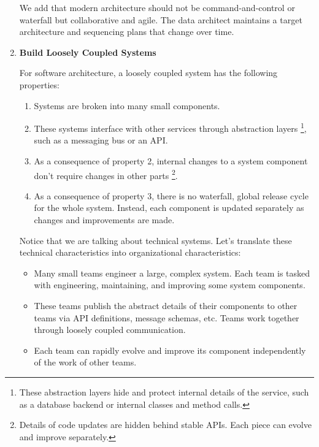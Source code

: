 \begin{enumerate}
    We add that modern architecture should not be command-and-control
    or waterfall but collaborative and agile. The data architect
    maintains a target architecture and sequencing plans that change
    over time.


    \item \textbf{Build Loosely Coupled Systems}
    
    \noindent
    For software architecture, a loosely coupled system has the
    following properties:
    \begin{enumerate}
        \item Systems are broken into many small components.
        \item These systems interface with other services through
        abstraction layers
        \footnote{
            These abstraction layers hide and protect internal details
            of the service, such as a database backend or internal
            classes and method calls.
        },
        such as a messaging bus or an API.
        \item As a consequence of property 2, internal changes to a
        system component don't require changes in other parts
        \footnote{
            Details of code updates are hidden behind stable APIs.
            Each piece can evolve and improve separately.
        }.
        \item As a consequence of property 3, there is no waterfall,
        global release cycle for the whole system. Instead, each
        component is updated separately as changes and improvements
        are made.
    \end{enumerate}
    Notice that we are talking about technical systems. Let's
    translate these technical characteristics into organizational
    characteristics:
    \begin{itemize}
        \item Many small teams engineer a large, complex system. Each
        team is tasked with  engineering, maintaining, and improving
        some system components.

        \item These teams publish the abstract details of their
        components to other teams via API definitions, message
        schemas, etc. Teams work together through loosely coupled
        communication.

        \item Each team can rapidly evolve and improve its component
        independently of the work of other teams.


\end{itemize}
\end{enumerate}
